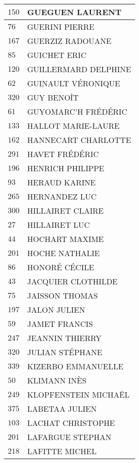 \begin{xltabular}{\linewidth}{|l|X|}
    \hline
    $150$ & GUEGUEN LAURENT \\
    \hline
    $76$ & GUERINI PIERRE \\
    \hline
    $167$ & GUERZIZ RADOUANE \\
    \hline
    $85$ & GUICHET ERIC \\
    \hline
    $120$ & GUILLERMARD DELPHINE \\
    \hline
    $62$ & GUINAULT VÉRONIQUE \\
    \hline
    $320$ & GUY BENOÎT \\
    \hline
    $61$ & GUYOMARC'H FRÉDÉRIC \\
    \hline
    $133$ & HALLOT MARIE-LAURE \\
    \hline
    $162$ & HANNECART CHARLOTTE \\
    \hline
    $291$ & HAVET FRÉDÉRIC \\
    \hline
    $196$ & HENRICH PHILIPPE \\
    \hline
    $93$ & HERAUD KARINE \\
    \hline
    $265$ & HERNANDEZ LUC \\
    \hline
    $300$ & HILLAIRET CLAIRE \\
    \hline
    $27$ & HILLAIRET LUC \\
    \hline
    $44$ & HOCHART MAXIME \\
    \hline
    $201$ & HOCHE NATHALIE \\
    \hline
    $86$ & HONORÉ CÉCILE \\
    \hline
    $43$ & JACQUIER CLOTHILDE \\
    \hline
    $75$ & JAISSON THOMAS \\
    \hline
    $197$ & JALON JULIEN \\
    \hline
    $59$ & JAMET FRANCIS \\
    \hline
    $247$ & JEANNIN THIERRY \\
    \hline
    $320$ & JULIAN STÉPHANE \\
    \hline
    $339$ & KIZERBO EMMANUELLE \\
    \hline
    $50$ & KLIMANN INÈS \\
    \hline
    $249$ & KLOPFENSTEIN MICHAËL \\
    \hline
    $375$ & LABETAA JULIEN \\
    \hline
    $103$ & LACHAT CHRISTOPHE \\
    \hline
    $201$ & LAFARGUE STEPHAN \\
    \hline
    $218$ & LAFITTE MICHEL \\

\end{xltabular}
